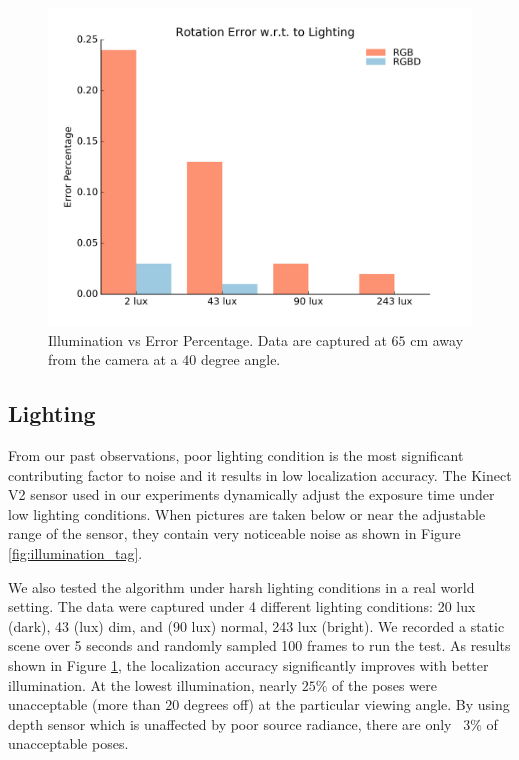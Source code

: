 \begin{figure}
\centering
\includegraphics[width=\columnwidth]{figs/lighting_fig1}
\caption{Illumination vs Error Percentage. Data are captured at $65$ cm away from the camera at a $40$ degree angle.}
\label{fig:lighting_result}
\end{figure}

\subsection{Lighting}

From our past observations, poor lighting condition is the most significant contributing factor to noise and it results in low localization accuracy. The Kinect V2 sensor used in our experiments dynamically adjust the exposure time under low lighting conditions. When pictures are taken below or near the adjustable range of the sensor, they contain very noticeable noise as shown in Figure \ref{fig:illumination_tag}.

We also tested the algorithm under harsh lighting conditions in a real world setting. The data were captured under 4 different lighting conditions: 20 lux (dark), 43 (lux) dim, and (90 lux) normal, 243 lux (bright). We recorded a static scene over 5 seconds and randomly sampled 100 frames to run the test.  As results shown in Figure \ref{fig:lighting_result}, the localization accuracy significantly improves with better illumination. At the lowest illumination, nearly $25\%$ of the poses were unacceptable (more than $20$ degrees off) at the particular viewing angle. By using depth sensor which is unaffected by poor source radiance, there are only ~$3\%$ of unacceptable poses.

